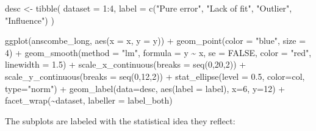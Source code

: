 \documentclass[
  letterpaper,
  10pt,
  krantz2]{krantz}
\makeatletter
\newenvironment{Shaded}{\begin{snugshade}}{\end{snugshade}}
\newcommand{\AttributeTok}[1]{\textcolor[rgb]{0.40,0.45,0.13}{#1}}
\newcommand{\ConstantTok}[1]{\textcolor[rgb]{0.56,0.35,0.01}{#1}}
\newcommand{\DecValTok}[1]{\textcolor[rgb]{0.68,0.00,0.00}{#1}}
\newcommand{\FloatTok}[1]{\textcolor[rgb]{0.68,0.00,0.00}{#1}}
\newcommand{\FunctionTok}[1]{\textcolor[rgb]{0.28,0.35,0.67}{#1}}
\newcommand{\NormalTok}[1]{\textcolor[rgb]{0.00,0.23,0.31}{#1}}
\newcommand{\OtherTok}[1]{\textcolor[rgb]{0.00,0.23,0.31}{#1}}
\newcommand{\SpecialCharTok}[1]{\textcolor[rgb]{0.37,0.37,0.37}{#1}}
\newcommand{\StringTok}[1]{\textcolor[rgb]{0.13,0.47,0.30}{#1}}
\newenvironment{kframe}{%
  \medskip{}
  \setlength{\fboxsep}{.8em}
  \def\at@end@of@kframe{}%
  \ifinner\ifhmode%
  \def\at@end@of@kframe{\end{minipage}}%
  \begin{minipage}{\columnwidth}%
  \fi\fi%
  \def\FrameCommand##1{\hskip\@totalleftmargin \hskip-\fboxsep
  \colorbox{shadecolor}{##1}\hskip-\fboxsep
      \hskip-\linewidth \hskip-\@totalleftmargin \hskip\columnwidth}%
  \MakeFramed {\advance\hsize-\width
    \@totalleftmargin\z@ \linewidth\hsize
    \@setminipage}}%
{\par\unskip\endMakeFramed%
  \at@end@of@kframe}
\renewenvironment{Shaded}{\begin{kframe}}{\end{kframe}}
\makeatother
\begin{document}
\begin{Shaded}
\begin{Highlighting}[]
\NormalTok{desc }\OtherTok{\textless{}{-}} \FunctionTok{tibble}\NormalTok{(}
  \AttributeTok{dataset =} \DecValTok{1}\SpecialCharTok{:}\DecValTok{4}\NormalTok{,}
  \AttributeTok{label =} \FunctionTok{c}\NormalTok{(}\StringTok{"Pure error"}\NormalTok{, }\StringTok{"Lack of fit"}\NormalTok{, }\StringTok{"Outlier"}\NormalTok{, }\StringTok{"Influence"}\NormalTok{)}
\NormalTok{)}

\FunctionTok{ggplot}\NormalTok{(anscombe\_long, }\FunctionTok{aes}\NormalTok{(}\AttributeTok{x =}\NormalTok{ x, }\AttributeTok{y =}\NormalTok{ y)) }\SpecialCharTok{+}
  \FunctionTok{geom\_point}\NormalTok{(}\AttributeTok{color =} \StringTok{"blue"}\NormalTok{, }\AttributeTok{size =} \DecValTok{4}\NormalTok{) }\SpecialCharTok{+}
  \FunctionTok{geom\_smooth}\NormalTok{(}\AttributeTok{method =} \StringTok{"lm"}\NormalTok{, }\AttributeTok{formula =}\NormalTok{ y }\SpecialCharTok{\textasciitilde{}}\NormalTok{ x, }\AttributeTok{se =} \ConstantTok{FALSE}\NormalTok{,}
              \AttributeTok{color =} \StringTok{"red"}\NormalTok{, }\AttributeTok{linewidth =} \FloatTok{1.5}\NormalTok{) }\SpecialCharTok{+}
  \FunctionTok{scale\_x\_continuous}\NormalTok{(}\AttributeTok{breaks =} \FunctionTok{seq}\NormalTok{(}\DecValTok{0}\NormalTok{,}\DecValTok{20}\NormalTok{,}\DecValTok{2}\NormalTok{)) }\SpecialCharTok{+}
  \FunctionTok{scale\_y\_continuous}\NormalTok{(}\AttributeTok{breaks =} \FunctionTok{seq}\NormalTok{(}\DecValTok{0}\NormalTok{,}\DecValTok{12}\NormalTok{,}\DecValTok{2}\NormalTok{)) }\SpecialCharTok{+}
  \FunctionTok{stat\_ellipse}\NormalTok{(}\AttributeTok{level =} \FloatTok{0.5}\NormalTok{, }\AttributeTok{color=}\NormalTok{col, }\AttributeTok{type=}\StringTok{"norm"}\NormalTok{) }\SpecialCharTok{+}
  \FunctionTok{geom\_label}\NormalTok{(}\AttributeTok{data=}\NormalTok{desc, }\FunctionTok{aes}\NormalTok{(}\AttributeTok{label =}\NormalTok{ label), }\AttributeTok{x=}\DecValTok{6}\NormalTok{, }\AttributeTok{y=}\DecValTok{12}\NormalTok{) }\SpecialCharTok{+}
  \FunctionTok{facet\_wrap}\NormalTok{(}\SpecialCharTok{\textasciitilde{}}\NormalTok{dataset, }\AttributeTok{labeller =}\NormalTok{ label\_both) }
\end{Highlighting}
\end{Shaded}

The subplots are labeled with the statistical idea they reflect:
\end{document}
